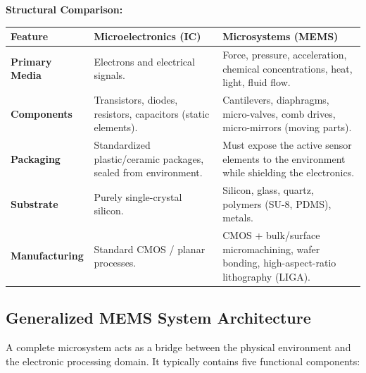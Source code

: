 \documentclass[12pt,a4paper]{article}
\begin{document}
\textbf{Structural Comparison:}\par\noindent
\begin{tabularx}{\linewidth}{|B{3.2cm}|Y|Y|}
\hline
\textbf{Feature} & \textbf{\color{myteal}Microelectronics (IC)} & \textbf{\color{mygreen}Microsystems (MEMS)} \\
\hline
\textbf{Primary Media} & Electrons and electrical signals. & Force, pressure, acceleration, chemical concentrations, heat, light, fluid flow. \\
\hline
\textbf{Components} & Transistors, diodes, resistors, capacitors (static elements). & Cantilevers, diaphragms, micro-valves, comb drives, micro-mirrors (moving parts). \\
\hline
\textbf{Packaging} & Standardized plastic/ceramic packages, sealed from environment. & Must expose the active sensor elements to the environment while shielding the electronics. \\
\hline
\textbf{Substrate} & Purely single-crystal silicon. & Silicon, glass, quartz, polymers (SU-8, PDMS), metals. \\
\hline
\textbf{Manufacturing} & Standard CMOS / planar processes. & CMOS + bulk/surface micromachining, wafer bonding, high-aspect-ratio lithography (LIGA). \\
\hline
\end{tabularx}

\subsection{Generalized MEMS System Architecture}
A complete microsystem acts as a bridge between the physical environment and the electronic processing domain. It typically contains five functional components:
\end{document}
